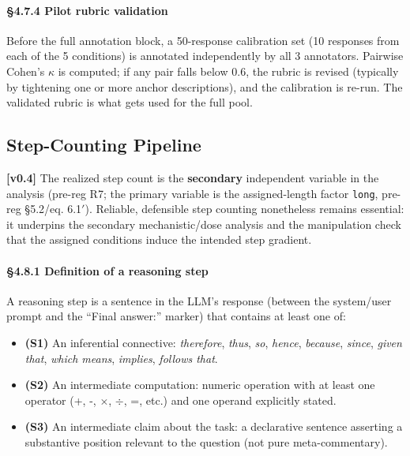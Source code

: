 \documentclass{article}
\providecommand{\tightlist}{\setlength{\itemsep}{0pt}\setlength{\parskip}{0pt}}
\begin{document}
\paragraph{\S{}4.7.4 Pilot rubric
validation}\label{pilot-rubric-validation}

Before the full annotation block, a 50-response calibration set (10
responses from each of the 5 conditions) is annotated independently by
all 3 annotators. Pairwise Cohen's \(\kappa\) is computed; if any pair
falls below 0.6, the rubric is revised (typically by tightening one or
more anchor descriptions), and the calibration is re-run. The validated
rubric is what gets used for the full pool.

\subsection{Step-Counting Pipeline}\label{step-counting-pipeline}

\textbf{{[}v0.4{]}} The realized step count is the \textbf{secondary}
independent variable in the analysis (pre-reg R7; the primary variable
is the assigned-length factor \texttt{long}, pre-reg \S{}5.2/eq. 6.1\ensuremath{\prime}).
Reliable, defensible step counting nonetheless remains essential: it
underpins the secondary mechanistic/dose analysis and the manipulation
check that the assigned conditions induce the intended step gradient.

\paragraph{\S{}4.8.1 Definition of a reasoning
step}\label{definition-of-a-reasoning-step}

A reasoning step is a sentence in the LLM's response (between the
system/user prompt and the ``Final answer:'' marker) that contains at
least one of:

\begin{itemize}
\tightlist
\item
  \textbf{(S1)} An inferential connective: \emph{therefore},
  \emph{thus}, \emph{so}, \emph{hence}, \emph{because}, \emph{since},
  \emph{given that}, \emph{which means}, \emph{implies}, \emph{follows
  that}.
\item
  \textbf{(S2)} An intermediate computation: numeric operation with at
  least one operator (+, -, \ensuremath{\times}, \ensuremath{\div}, =, etc.) and one operand explicitly
  stated.
\item
  \textbf{(S3)} An intermediate claim about the task: a declarative
  sentence asserting a substantive position relevant to the question
  (not pure meta-commentary).
\end{itemize}
\end{document}
